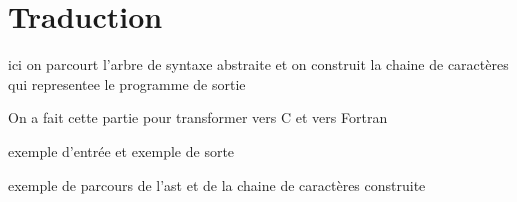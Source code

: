 \section{Traduction}


\begin{frame}
    ici on parcourt l'arbre de syntaxe abstraite et on construit la chaine de caractères qui representee le programme de sortie
    
    On a fait cette partie pour transformer vers C et vers Fortran
    
    exemple d'entrée et exemple de sorte


\end{frame}


\begin{frame}
    exemple de parcours de l'ast et de la chaine de caractères construite 
\end{frame}

